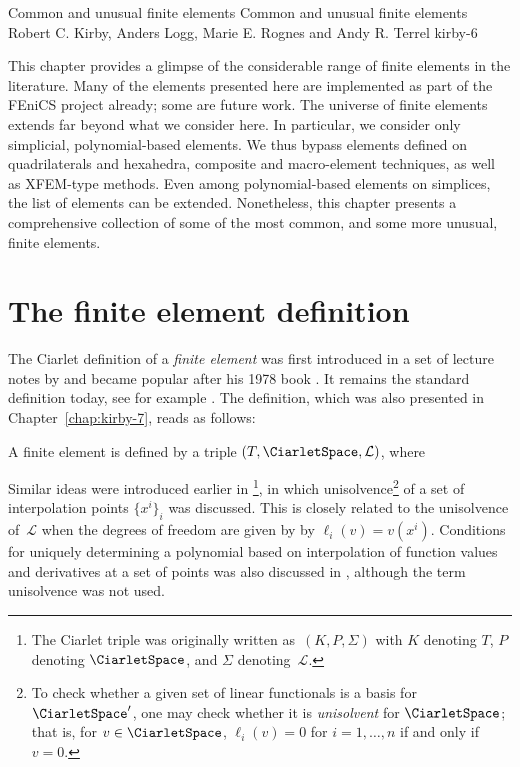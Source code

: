               {Common and unusual finite elements}
              {Common and unusual finite elements}
              {Robert C. Kirby, Anders Logg, Marie E. Rognes and Andy R. Terrel}
              {kirby-6}

\newcommand{\elmfig}[1]{\texttt{[image: chapters/kirby-6/png/\#1.png]}}
\newcommand{\elmdesc}[1]{\begin{minipage}{4cm} #1 \end{minipage} \\}

This chapter provides a glimpse of the considerable range of finite
elements in the literature. Many of the elements presented here are
implemented as part of the FEniCS project already; some are future work.
The universe of finite elements extends far beyond what we consider
here. In particular, we consider only simplicial, polynomial-based
elements. We thus bypass elements defined on quadrilaterals and hexahedra,
composite and macro-element techniques, as well as XFEM-type methods. Even
among polynomial-based elements on simplices, the list of elements can be
extended. Nonetheless, this chapter presents a comprehensive collection
of some of the most common, and some more unusual, finite elements.

\section{The finite element definition}

The Ciarlet definition of a \emph{finite element} was first introduced
in a set of lecture notes by \citet{Ciarlet1975} and became popular
after his 1978 book \citep{Ciarlet2002}. It remains the standard
definition today, see for example \citet{BrennerScott2008}. The
definition, which was also presented in Chapter~\ref{chap:kirby-7},
reads as follows:
\begin{definition}
  A finite element is defined by a triple
  $(T, \CiarletSpace,\mathcal{L})$, where
  \femdefinition{}
\end{definition}
Similar ideas were introduced earlier in
\citet{CiarletRaviart1972}\footnote{The Ciarlet triple was originally
  written as~$(K, P, \Sigma)$ with $K$ denoting $T$, $P$ denoting $\CiarletSpace$, and $\Sigma$
  denoting~$\mathcal{L}$.}, in which unisolvence\footnote{To check
  whether a given set of linear functionals is a basis for
  $\CiarletSpace'$, one may check whether it is \emph{unisolvent} for
  $\CiarletSpace$; that is, for $v \in \CiarletSpace$, $\ell_i(v) = 0$
  for $i = 1, \dots, n$ if and only if $v = 0$.} of a set of
interpolation points $\{x^i\}_i$ was discussed. This is closely
related to the unisolvence of~$\mathcal{L}$ when the degrees of
freedom are given by by $\ell_i(v) = v(x^i)$.  Conditions for uniquely
determining a polynomial based on interpolation of function values and
derivatives at a set of points was also discussed in
\citet{BrambleZlamal1970}, although the term unisolvence was not used.

